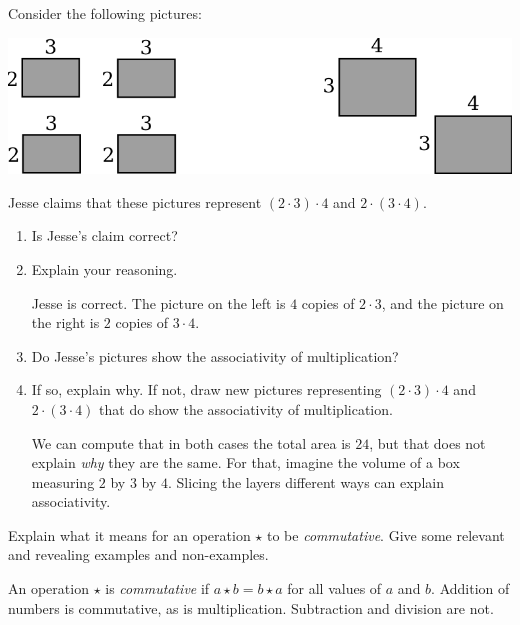 \documentclass[nooutcomes]{ximera}
\begin{document}
\begin{problem}Consider the following pictures:
\begin{image}
\includegraphics{assMult.png}
\end{image}
Jesse claims that these pictures represent $(2\cdot 3)\cdot 4$ and
$2\cdot (3\cdot 4)$.
\begin{enumerate}
\item Is Jesse's claim correct? 
\begin{multipleChoice}
\end{multipleChoice}
\item Explain your reasoning.
\begin{freeResponse}
\begin{hint}
Jesse is correct.  The picture on the left is $4$ copies of $2\cdot 3$, and the picture on the right is $2$ copies of $3\cdot 4$.  
\end{hint}
\end{freeResponse}
\item Do Jesse's pictures show the associativity of multiplication? 
\begin{multipleChoice}
\end{multipleChoice}
\item If so, explain why. If not, draw new pictures representing $(2\cdot
  3)\cdot 4$ and $2\cdot (3\cdot 4)$ that do show the associativity
  of multiplication.
\begin{freeResponse}
\begin{hint}
We can compute that in both cases the total area is $24$, but that does not explain \textit{why} they are the same.  For that, imagine the volume of a box measuring $2$ by $3$ by $4$.  Slicing the layers different ways can explain associativity.  
\end{hint}
\end{freeResponse}
\end{enumerate}
\end{problem} 

\begin{problem}Explain what it means for an operation $\star$ to be
  \textit{commutative}. Give some relevant and revealing examples  and non-examples.
\begin{freeResponse}
\begin{hint}
An operation $\star$ is \textit{commutative} if $a\star b = b\star a$ for all values of $a$ and $b$.  Addition of numbers is commutative, as is multiplication.  Subtraction and division are not.  
\end{hint}
\end{freeResponse}
\end{problem} 
\end{document}
